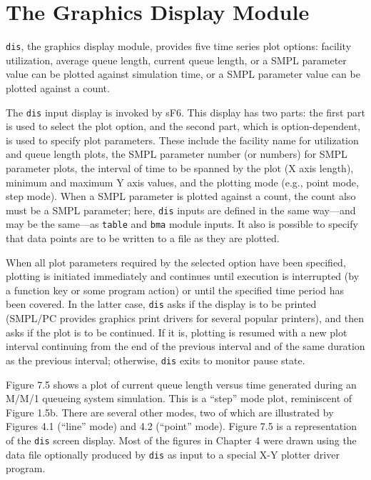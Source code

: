 \section{The Graphics Display Module}
\label{sec:simenv-dis}

\texttt{dis}, the graphics display module, provides five time series plot options:
facility utilization, average queue length, current queue length, or a SMPL
parameter value can be plotted against simulation time, or a SMPL parameter
value can be plotted against a count.

The \texttt{dis} input display is invoked by sF6. This display has two parts: the
first part is used to select the plot option, and the second part, which is
option-dependent, is used to specify plot parameters. These include the
facility name for utilization and queue length plots, the SMPL parameter
number (or numbers) for SMPL parameter plots, the interval of time to be
spanned by the plot (X axis length), minimum and maximum Y axis values,
and the plotting mode (e.g., point mode, step mode). When a SMPL parameter
is plotted against a count, the count also must be a SMPL parameter;
here, \texttt{dis} inputs are defined in the same way---and may be the same---as
\texttt{table} and \texttt{bma} module inputs. It also is possible to specify that data points
are to be written to a file as they are plotted.

When all plot parameters required by the selected option have been
specified, plotting is initiated immediately and continues until execution is
interrupted (by a function key or some program action) or until the specified
time period has been covered. In the latter case, \texttt{dis} asks if the display is to
be printed (SMPL/PC provides graphics print drivers for several popular
printers), and then asks if the plot is to be continued. If it is, plotting is
resumed with a new plot interval continuing from the end of the previous
interval and of the same duration as the previous interval; otherwise, \texttt{dis}
exits to monitor pause state.

Figure 7.5 shows a plot of current queue length versus time generated
during an M/M/1 queueing system simulation. This is a ``step'' mode plot,
reminiscent of Figure 1.5b. There are several other modes, two of which are
illustrated by Figures 4.1 (``line'' mode) and 4.2 (``point'' mode). Figure 7.5 is
a representation of the \texttt{dis} screen display. Most of the figures in Chapter 4
were drawn using the data file optionally produced by \texttt{dis} as input to a
special X-Y plotter driver program.

